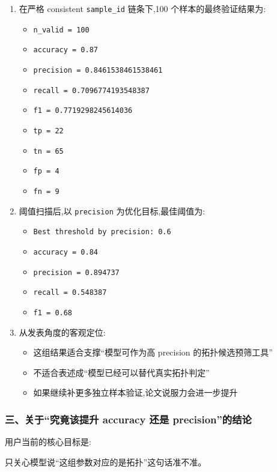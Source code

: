 \documentclass[lang=cn,scheme=chinese,color=blue,device=normal,toc=onecol,math=cm]{elegantbook}
\begin{document}
\begin{enumerate}
\item 在严格 consistent \texttt{sample\_\allowbreak{}id} 链条下,100 个样本的最终验证结果为: 
\begin{itemize}
\item \texttt{n\_\allowbreak{}valid = 100}
\item \texttt{accuracy = 0.87}
\item \texttt{precision = 0.8461538461538461}
\item \texttt{recall = 0.7096774193548387}
\item \texttt{f1 = 0.7719298245614036}
\item \texttt{tp = 22}
\item \texttt{tn = 65}
\item \texttt{fp = 4}
\item \texttt{fn = 9}
\end{itemize}
\item 阈值扫描后,以 \texttt{precision} 为优化目标,最佳阈值为: 
\begin{itemize}
\item \texttt{Best threshold by precision: 0.6}
\item \texttt{accuracy = 0.84}
\item \texttt{precision = 0.894737}
\item \texttt{recall = 0.548387}
\item \texttt{f1 = 0.68}
\end{itemize}
\item 从发表角度的客观定位: 
\begin{itemize}
\item 这组结果适合支撑“模型可作为高 precision 的拓扑候选预筛工具”
\item 不适合表述成“模型已经可以替代真实拓扑判定”
\item 如果继续补更多独立样本验证,论文说服力会进一步提升
\end{itemize}
\end{enumerate}


\subsubsection{三、关于“究竟该提升 accuracy 还是 precision”的结论}


用户当前的核心目标是:\par


\begin{quotebox}
只关心模型说“这组参数对应的是拓扑”这句话准不准。\par
\end{quotebox}
\end{document}
